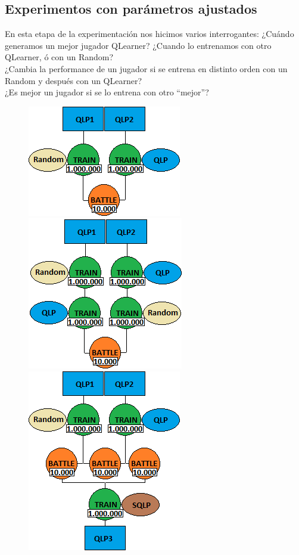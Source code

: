 \documentclass[10pt, a4paper]{article}
\begin{document}
\subsection{Experimentos con parámetros ajustados}

En esta etapa de la experimentación nos hicimos varios interrogantes:
¿Cuándo generamos un mejor jugador QLearner?
¿Cuando lo entrenamos con otro QLearner, ó con un Random? \\
¿Cambia la performance de un jugador si se entrena en distinto orden con un Random y después con un QLearner?\\
¿Es mejor un jugador si se lo entrena con otro ``mejor''?

\begin{figure}[H]
  \begin{minipage}[c]{1\textwidth}
  \includegraphics[scale=0.5]{E1.png}
  \includegraphics[scale=0.5]{E2.png}
  \includegraphics[scale=0.5]{E3.png}

\end{minipage}
\end{figure}
\end{document}
